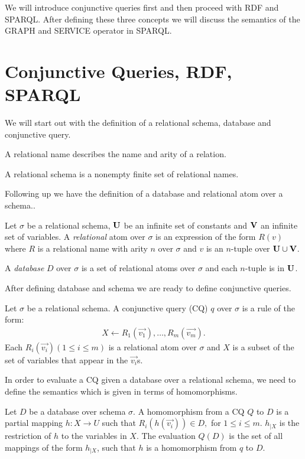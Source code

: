 We will introduce conjunctive queries first and then proceed with RDF and
SPARQL. After defining these three concepts we will discuss the semantics of
the GRAPH and SERVICE operator in SPARQL.

\section{Conjunctive Queries, RDF, SPARQL}
We will start out with the definition of a 
relational schema, database and conjunctive query. 

A relational name describes the name and arity of a relation.
\begin{definition}
	A relational schema is a nonempty finite set of relational names.
\end{definition}
Following up we have the definition of a database and relational atom over a
schema..

\begin{definition}
	Let $\sigma$ be a relational schema, 
	$\mathbf{U}$ be an infinite set of constants and $\mathbf{V}$ an infinite set of variables.
	A \emph{relational} atom over $\sigma$ is an expression of the form $R(v)$ where $R$
	is a relational name with arity $n$ over $\sigma$ and $v$ is an $n$-tuple over
	$\mathbf{U} \cup \mathbf{V}$.

	A \emph{database} $D$ over $\sigma$ is a set of relational atoms over $\sigma$ and
	each $n$-tuple is in $\mathbf{U}$.
\end{definition}

After defining database and schema we are ready to define
conjunctive queries.

\begin{definition}
	Let $\sigma$ be a relational schema.
	A conjunctive query (CQ) $q$ over $\sigma$ is a rule of the form:
	\begin{align*}
		X \leftarrow R_1(\vec{v_1}), \dots, R_m(\vec{v_m}).
	\end{align*}
	Each $R_i(\vec{v_i}) (1\leq i \leq m)$ is a relational atom over $\sigma$ and 
	$X$ is a subset of the set of variables that appear in the
	$\vec{v_i}$s.
\end{definition}

In order to evaluate a CQ given a database over a relational schema, 
we need to define the semantics which is given in terms of homomorphisms.
\begin{definition}
	Let $D$ be a database over schema $\sigma$.  A homomorphism from a CQ $Q$ to $D$ is a
	partial mapping $h: X \rightarrow U$ such that $R_i(h(\vec{v_i})) \in D,$ for 
	$1 \leq i \leq m$. $h_{|X}$ is the restriction of $h$ to the variables in
	$X$. The evaluation $Q(D)$ is the set of all mappings of the form
	$h_{|X}$, such that $h$ is a homomorphism from $q$ to $D$.
\end{definition}

